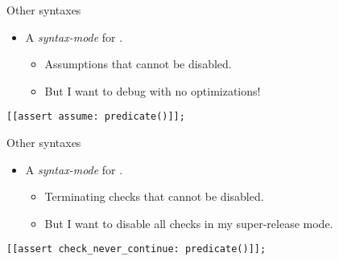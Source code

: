 \begin{frame}[t,fragile]{Other syntaxes}
\begin{itemize}
  \item A \emph{syntax-mode} for .
    \begin{itemize}
      \item Assumptions that cannot be disabled.
      \item But I want to debug with no optimizations!
    \end{itemize}
\end{itemize}
\begin{lstlisting}
[[assert assume: predicate()]];
\end{lstlisting}
\end{frame}

\begin{frame}[t,fragile]{Other syntaxes}
\begin{itemize}
  \item A \emph{syntax-mode} for .
    \begin{itemize}
      \item Terminating checks that cannot be disabled.
      \item But I want to disable all checks in my super-release mode.
    \end{itemize}
\end{itemize}
\begin{lstlisting}
[[assert check_never_continue: predicate()]];
\end{lstlisting}
\end{frame}
